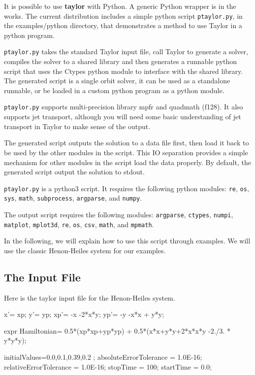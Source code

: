 \documentclass[10pt]{article}
\theoremstyle{remark}
\newcommand{\taylorname}{{\bf taylor}}
\begin{document}
 It is possible to use \taylorname{} with Python. A generic Python
 wrapper is in the works. The current distribution includes a simple
 python script \verb+ptaylor.py+, in the examples/python directory,
 that demonstrates a method to use Taylor in a python program.
 
 \vspace{4mm} \verb+ptaylor.py+ takes the standard Taylor input file,
 call Taylor to generate a solver, compiles the solver to a shared
 library and then generates a runnable python script that uses the
 Ctypes python module to interface with the shared library. The
 generated script is a single orbit solver, it can be used as a
 standalone runnable, or be loaded in a custom python program as a
 python module.

 \vspace{4mm} \verb+ptaylor.py+ supports multi-precision library mpfr
 and quadmath (f128).  It also supports jet transport, although you
 will need some basic understanding of jet transport in Taylor to make
 sense of the output.

 \vspace{4mm} The generated script outputs the solution to a data file
 first, then load it back to be used by the other modules in the
 script. This IO separation provides a simple mechanism for other
 modules in the script load the data properly. By default, the
 generated script output the solution to stdout.

 \vspace{4mm} \verb+ptaylor.py+ is a python3 script. It requires the
 following python modules: \verb+re+, \verb+os+, \verb+sys+,
 \verb+math+, \verb+subprocess+, \verb+argparse+, and \verb+numpy+.

 \vspace{4mm} The output script requires the following modules:
 \verb+argparse+, \verb+ctypes+, \verb+numpi+, \verb+matplot+,
 \verb+mplot3d+, \verb+re+, \verb+os+, \verb+csv+, \verb+math+, and
 \verb+mpmath+.

 \vspace{4mm} In the following, we will explain how to use this script
 through examples. We will use the classic Henon-Heiles system for our
 examples.

 \subsection{The Input File}

Here is the taylor input file for the Henon-Heiles system.
\begin{code}[title={File {\tt henon.eq}}]
x'= xp;
y'= yp;
xp'= -x -2*x*y;
yp'= -y -x*x + y*y;

expr Hamiltonian= 0.5*(xp*xp+yp*yp) + 0.5*(x*x+y*y+2*x*x*y -2./3. * y*y*y);

initialValues=0.0,0.1,0.39,0.2 ;
absoluteErrorTolerance = 1.0E-16;
relativeErrorTolerance = 1.0E-16;
stopTime = 100;
startTime = 0.0; 
\end{code}
\end{document}
